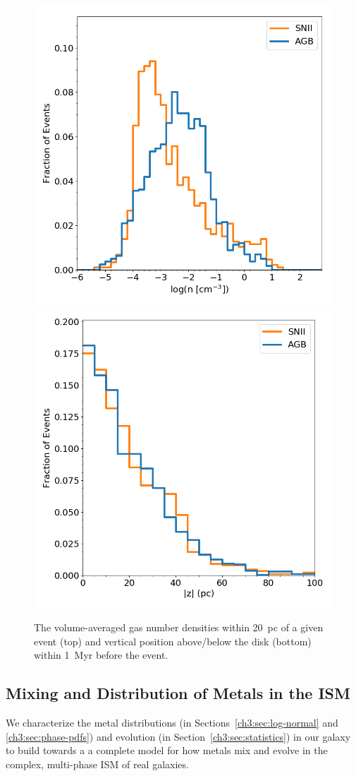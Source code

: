 \begin{figure}
\centering
\includegraphics[width=0.6\linewidth]{figures/ch3/SE_density}\\
\includegraphics[width=0.6\linewidth]{figures/ch3/SE_z}
\caption{The volume-averaged gas number densities within 20~pc of a given event (top) and vertical position above/below the disk (bottom) within 1~Myr before the event.}
\label{ch3:fig:spatial distribution}
\end{figure}


\subsection{Mixing and Distribution of Metals in the ISM}
\label{ch3:sec:mixing}
We characterize the metal distributions (in Sections~\ref{ch3:sec:log-normal} and \ref{ch3:sec:phase-pdfs}) and evolution (in Section~\ref{ch3:sec:statistics}) in our galaxy to build towards a  a complete model for how metals mix and evolve in the complex, multi-phase ISM of real galaxies.

